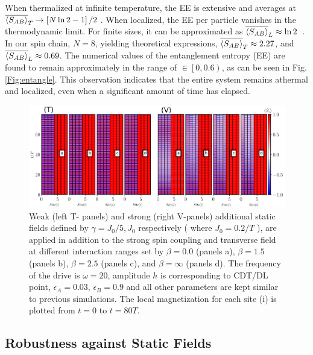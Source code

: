 \documentclass[12pt]{iopart}
\begin{document}
When thermalized at infinite temperature, the EE is extensive and averages at $\displaystyle \overline{\expval{S_{AB}}}_T\rightarrow \left[N \ln{2}-1\right]/2$ \cite{Lu2021}. When localized, the EE per particle vanishes in the thermodynamic limit. For finite sizes, it can be approximated as $\overline{\expval{S_{AB}}}_L\approx \ln{2}$~\cite{sakurai_phys_nodate}. In our spin chain, $N=8$, yielding theoretical expressions, $\overline{\expval{S_{AB}}}_T\approx 2.27$, and $\overline{\expval{S_{AB}}}_L\approx 0.69$. The numerical values of the entanglement entropy (EE) are found to remain approximately in the range of $\in\left[0,0.6\right)$, as can be seen in Fig.\ref{Fig:entangle}. This observation indicates that the entire system remains athermal and localized, even when a significant amount of time has elapsed.
\begin{figure}[t!]
	\begin{center}
		\includegraphics[width=15cm]{robust_J_N_8.png}
	\end{center}
	\caption{Weak (left T- panels) and strong (right V-panels) additional static fields defined by $\gamma = J_0/5, J_0$ respectively ( where $J_0=0.2/T$ ), are applied in addition to the strong spin coupling and transverse field at different interaction ranges set by $\beta = 0.0$ (panels a), $\beta= 1.5$ (panels b), $\beta=2.5$ (panels c), and $\beta= \infty$ (panels d). The frequency of the drive is $\omega = 20$, amplitude $h$ is corresponding to CDT/DL point, $\epsilon_A=0.03$, $\epsilon_B=0.9$ and all other parameters are kept similar to previous simulations.  The local magnetization for each site (i) is plotted from $t=0$ to $t=80 T$.}
	\label{Fig:robustness}
\end{figure}	
\subsection{\label{sec:level43} Robustness against Static Fields}
\end{document}
